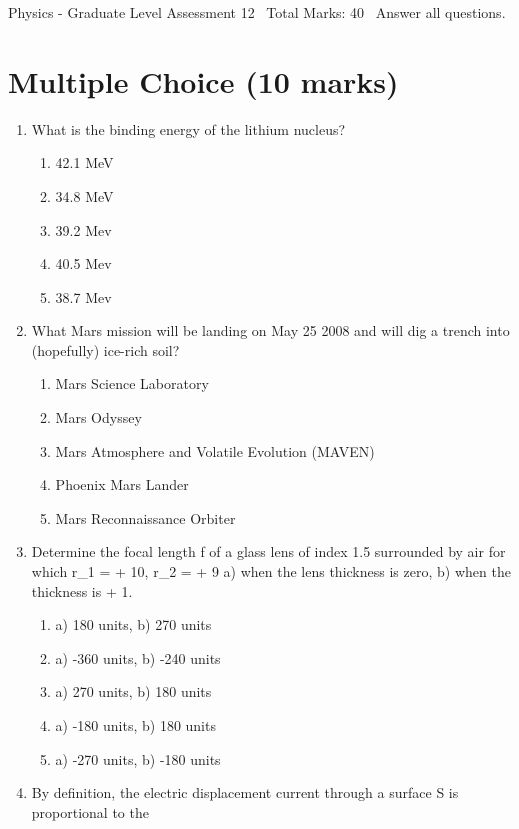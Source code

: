 \documentclass[12pt]{article}
\begin{document}
\begin{center}
Physics - Graduate Level Assessment 12 \
Total Marks: 40 \
Answer all questions.
\end{center}

\section*{Multiple Choice (10 marks)}
\begin{enumerate}[label=\arabic*.]
\item What is the binding energy of the lithium nucleus?
\begin{enumerate}[label=(\alph*)]
    \item 42.1 MeV
    \item 34.8 MeV
    \item 39.2 Mev
    \item 40.5 Mev
    \item 38.7 Mev
\end{enumerate}
\item What Mars mission will be landing on May 25 2008 and will dig a trench into (hopefully) ice-rich soil?
\begin{enumerate}[label=(\alph*)]
    \item Mars Science Laboratory
    \item Mars Odyssey
    \item Mars Atmosphere and Volatile Evolution (MAVEN)
    \item Phoenix Mars Lander
    \item Mars Reconnaissance Orbiter
\end{enumerate}
\item Determine the focal length f of a glass lens of index 1.5 surrounded by air for which r\_1 = + 10, r\_2 = + 9 a) when the lens thickness is zero, b) when the thickness is + 1.
\begin{enumerate}[label=(\alph*)]
    \item a) 180 units, b) 270 units
    \item a) -360 units, b) -240 units
    \item a) 270 units, b) 180 units
    \item a) -180 units, b) 180 units
    \item a) -270 units, b) -180 units
\end{enumerate}
\item By definition, the electric displacement current through a surface S is proportional to the
\begin{enumerate}[label=(\alph*)]

\end{enumerate}
\end{enumerate}
\end{document}
